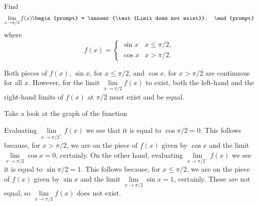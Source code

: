 \documentclass{ximera}
\author{Gregory Hartman \and Matthew Carr}
\begin{document}
\begin{exercise}



  Find 
  \[
  \displaystyle \lim_{x\to \pi/2} f(x)
  \begin{prompt}
  = \answer{\text{Limit does not exist}}.
  \end{prompt}
  \]
  where
  \[
  f(x) = \left\{\begin{array}{cl} \sin x & x\leq \pi/2, \\ \cos x & x>\pi/2. \end{array}\right.
  \]
    \begin{hint}
     Both pieces of $f(x)$, $\sin x$, for $x\leq\pi/2$, and $\cos x$, for $x>\pi/2$ are continuous for all $x$. However, for the limit $\lim\limits_{x\to\pi/2}f(x)$ to exist, both the left-hand and the right-hand limits of $f(x)$ at $\pi/2$ must exist and be equal.
    \end{hint}
     \begin{hint}
    	Take a look at the graph of the function
    \begin{center}
      \end{center} 
    \end{hint}
    \begin{hint}
     Evaluating $\lim\limits_{x\to{\pi/2}^{+}}f(x)$ we see that it is equal to $\cos \pi/2=0$. This follows because, for $x>\pi/2$, we are on the piece of $f(x)$ given by $\cos x$ and the limit $\lim\limits_{x\to{\pi/2}}\cos x=0$, certainly. On the other hand, evaluating $\lim\limits_{x\to{\pi/2}^{-}}f(x)$ we see it is equal to $\sin \pi/2=1$. This follows because, for $x\leq\pi/2$, we are on the piece of $f(x)$ given by $\sin x$ and the limit $\lim\limits_{x\to\pi/2}\sin x=1$, certainly. These are not equal, so $\lim\limits_{x\to\pi/2}f(x)$ does not exist.
    \end{hint}
\end{exercise}
\end{document}
